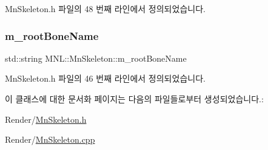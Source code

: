 Mn\+Skeleton.\+h 파일의 48 번째 라인에서 정의되었습니다.

\mbox{\label{class_m_n_l_1_1_mn_skeleton_a06064d27da5eb5ce0074f9f08abd54f6}} 
\subsubsection{\texorpdfstring{m\+\_\+root\+Bone\+Name}{m\_rootBoneName}}
{\footnotesize\ttfamily std\+::string M\+N\+L\+::\+Mn\+Skeleton\+::m\+\_\+root\+Bone\+Name\hspace{0.3cm}{\ttfamily [private]}}



Mn\+Skeleton.\+h 파일의 46 번째 라인에서 정의되었습니다.



이 클래스에 대한 문서화 페이지는 다음의 파일들로부터 생성되었습니다.\+:\begin{DoxyCompactItemize}
\item 
Render/\hyperlink{_mn_skeleton_8h}{Mn\+Skeleton.\+h}\item 
Render/\hyperlink{_mn_skeleton_8cpp}{Mn\+Skeleton.\+cpp}\end{DoxyCompactItemize}
